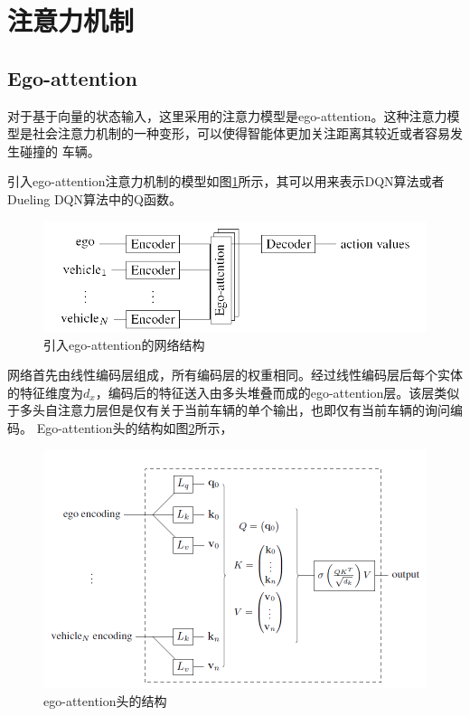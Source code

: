 \documentclass[letterpaper, 10 pt, conference]{ieeeconf}  %
\begin{document}
\section{注意力机制}
\subsection{Ego-attention}
对于基于向量的状态输入，这里采用的注意力模型是ego-attention\cite{leurent2019social}。这种注意力模型是社会注意力机制的一种变形，可以使得智能体更加关注距离其较近或者容易发生碰撞的
车辆。

引入ego-attention注意力机制的模型如图\ref{fig:ego-attention}所示，其可以用来表示DQN算法或者Dueling DQN算法中的Q函数。
\begin{figure}[htbp]
    \centering
    \includegraphics[width=\linewidth]{fig/网络结构.png}
    \caption{引入ego-attention的网络结构}
    \label{fig:ego-attention}
  \end{figure}
网络首先由线性编码层组成，所有编码层的权重相同。经过线性编码层后每个实体
的特征维度为$d_x$，编码后的特征送入由多头堆叠而成的ego-attention层。该层类似于多头自注意力层\cite{vaswani2017attention}但是仅有关于当前车辆的单个输出，也即仅有当前车辆的询问编码。
Ego-attention头的结构如图\ref{fig:ego-head}所示，
\begin{figure}[htbp]
    \centering
    \includegraphics[width=\linewidth]{fig/ego-attention结构.png}
    \caption{ego-attention头的结构}
    \label{fig:ego-head}
  \end{figure}
\end{document}
